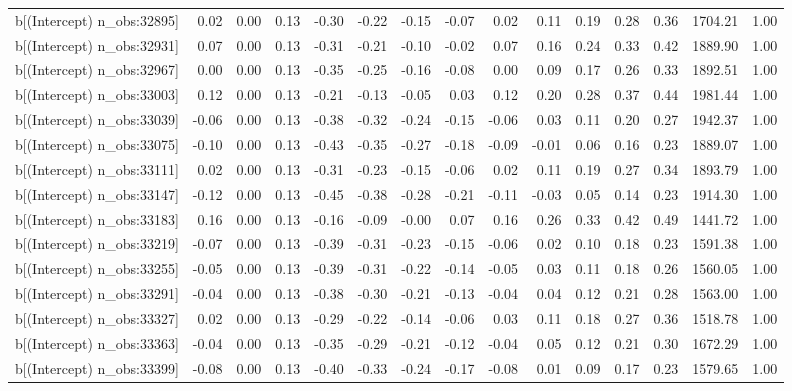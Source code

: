 \begin{table}[ht]
\begin{tabular}{rrrrrrrrrrrrrrr}
  b[(Intercept) n\_obs:32895] & 0.02 & 0.00 & 0.13 & -0.30 & -0.22 & -0.15 & -0.07 & 0.02 & 0.11 & 0.19 & 0.28 & 0.36 & 1704.21 & 1.00 \\ 
  b[(Intercept) n\_obs:32931] & 0.07 & 0.00 & 0.13 & -0.31 & -0.21 & -0.10 & -0.02 & 0.07 & 0.16 & 0.24 & 0.33 & 0.42 & 1889.90 & 1.00 \\ 
  b[(Intercept) n\_obs:32967] & 0.00 & 0.00 & 0.13 & -0.35 & -0.25 & -0.16 & -0.08 & 0.00 & 0.09 & 0.17 & 0.26 & 0.33 & 1892.51 & 1.00 \\ 
  b[(Intercept) n\_obs:33003] & 0.12 & 0.00 & 0.13 & -0.21 & -0.13 & -0.05 & 0.03 & 0.12 & 0.20 & 0.28 & 0.37 & 0.44 & 1981.44 & 1.00 \\ 
  b[(Intercept) n\_obs:33039] & -0.06 & 0.00 & 0.13 & -0.38 & -0.32 & -0.24 & -0.15 & -0.06 & 0.03 & 0.11 & 0.20 & 0.27 & 1942.37 & 1.00 \\ 
  b[(Intercept) n\_obs:33075] & -0.10 & 0.00 & 0.13 & -0.43 & -0.35 & -0.27 & -0.18 & -0.09 & -0.01 & 0.06 & 0.16 & 0.23 & 1889.07 & 1.00 \\ 
  b[(Intercept) n\_obs:33111] & 0.02 & 0.00 & 0.13 & -0.31 & -0.23 & -0.15 & -0.06 & 0.02 & 0.11 & 0.19 & 0.27 & 0.34 & 1893.79 & 1.00 \\ 
  b[(Intercept) n\_obs:33147] & -0.12 & 0.00 & 0.13 & -0.45 & -0.38 & -0.28 & -0.21 & -0.11 & -0.03 & 0.05 & 0.14 & 0.23 & 1914.30 & 1.00 \\ 
  b[(Intercept) n\_obs:33183] & 0.16 & 0.00 & 0.13 & -0.16 & -0.09 & -0.00 & 0.07 & 0.16 & 0.26 & 0.33 & 0.42 & 0.49 & 1441.72 & 1.00 \\ 
  b[(Intercept) n\_obs:33219] & -0.07 & 0.00 & 0.13 & -0.39 & -0.31 & -0.23 & -0.15 & -0.06 & 0.02 & 0.10 & 0.18 & 0.23 & 1591.38 & 1.00 \\ 
  b[(Intercept) n\_obs:33255] & -0.05 & 0.00 & 0.13 & -0.39 & -0.31 & -0.22 & -0.14 & -0.05 & 0.03 & 0.11 & 0.18 & 0.26 & 1560.05 & 1.00 \\ 
  b[(Intercept) n\_obs:33291] & -0.04 & 0.00 & 0.13 & -0.38 & -0.30 & -0.21 & -0.13 & -0.04 & 0.04 & 0.12 & 0.21 & 0.28 & 1563.00 & 1.00 \\ 
  b[(Intercept) n\_obs:33327] & 0.02 & 0.00 & 0.13 & -0.29 & -0.22 & -0.14 & -0.06 & 0.03 & 0.11 & 0.18 & 0.27 & 0.36 & 1518.78 & 1.00 \\ 
  b[(Intercept) n\_obs:33363] & -0.04 & 0.00 & 0.13 & -0.35 & -0.29 & -0.21 & -0.12 & -0.04 & 0.05 & 0.12 & 0.21 & 0.30 & 1672.29 & 1.00 \\ 
  b[(Intercept) n\_obs:33399] & -0.08 & 0.00 & 0.13 & -0.40 & -0.33 & -0.24 & -0.17 & -0.08 & 0.01 & 0.09 & 0.17 & 0.23 & 1579.65 & 1.00 \\ 

\end{tabular}
\end{table}
